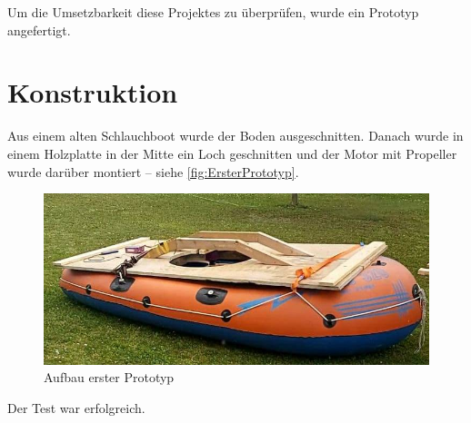 Um die Umsetzbarkeit diese Projektes zu überprüfen, wurde ein Prototyp angefertigt.

\section{Konstruktion}
Aus einem alten Schlauchboot wurde der Boden ausgeschnitten. Danach wurde in einem Holzplatte in der Mitte ein Loch geschnitten und der Motor mit Propeller wurde darüber montiert -- siehe \autoref{fig:ErsterPrototyp}.
\begin{figure}[h!]
  \centering
  \includegraphics[width=.95\textwidth]{./Aufbau1.jpg}
  \caption{Aufbau erster Prototyp}
  \label{fig:ErsterPrototyp}
\end{figure}

Der Test war erfolgreich.
